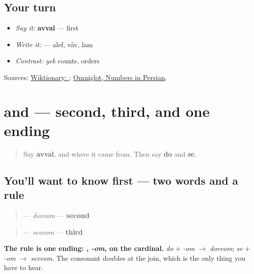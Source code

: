 \subsection*{Your turn}
\begin{itemize}
\raggedright
  \item \emph{Say it:} \textbf{avval} — first
  \item \emph{Write it:} \textbf{} — alef, vâv, lam
  \item \emph{Contrast:} \emph{yek} counts, \textbf{} orders
\end{itemize}

\begin{tcolorbox}[breakable,colback=teal!4,colframe=teal!35!black,title={Before you move on}]
Sources: \href{https://en.wiktionary.org/wiki/\%D8\%A7\%D9\%88\%D9\%84}{Wiktionary: }; \href{https://www.omniglot.com/language/numbers/persian.htm}{Omniglot, Numbers in Persian}.
\end{tcolorbox}
\section[\texorpdfstring{\fa{دوم} \fa{سوم} (dovvom sevvom)}{دوم سوم (dovvom sevvom)}]{ and  — second, third, and one ending}

\label{lesson:FA-C20-dovvom-sevvom}



\begin{quote}
Say \textbf{avval}, and where it came from. Then say \textbf{do} and \textbf{se}.
\end{quote}

\subsection*{You'll want to know first — two words and a rule}
\begin{quote}
\textbf{} — \emph{dovvom} — \textbf{second}
\end{quote}

\begin{quote}
\textbf{} — \emph{sevvom} — \textbf{third}
\end{quote}

\textbf{The rule is one ending: , \emph{-om}, on the cardinal.} \emph{do} + \emph{-om} $\to$ \emph{dovvom}; \emph{se} + \emph{-om} $\to$ \emph{sevvom}. The consonant doubles at the join, which is the only thing you have to hear.


